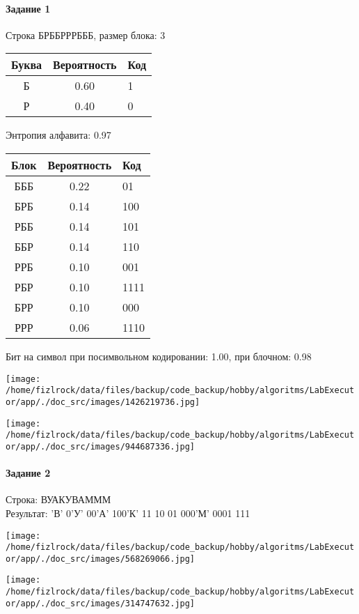 \documentclass[a4paper, 12pt]{article}
\begin{document}
\paragraph{Задание 1}

Строка БРББРРРБББ, размер блока: 3
\begin{center}
 \begin{tabular}{ |c|c|l| } 
  \hline
     Буква & Вероятность & Код\\ \hline
Б & 0.60 & 1\\\hline
Р & 0.40 & 0
\\ \hline \end{tabular}
\end{center}
Энтропия алфавита: 0.97
\begin{center}
 \begin{tabular}{ |c|c|l| } 
  \hline
     Блок & Вероятность & Код\\ \hline
БББ & 0.22 & 01\\\hline
БРБ & 0.14 & 100\\\hline
РББ & 0.14 & 101\\\hline
ББР & 0.14 & 110\\\hline
РРБ & 0.10 & 001\\\hline
РБР & 0.10 & 1111\\\hline
БРР & 0.10 & 000\\\hline
РРР & 0.06 & 1110
\\ \hline \end{tabular}
\end{center}
Бит на символ при посимвольном кодировании: 1.00, при блочном: 0.98

\texttt{[image: /home/fizlrock/data/files/backup/code\_backup/hobby/algoritms/LabExecutor/app/./doc\_src/images/1426219736.jpg]}

\texttt{[image: /home/fizlrock/data/files/backup/code\_backup/hobby/algoritms/LabExecutor/app/./doc\_src/images/944687336.jpg]}
\pagebreak
\paragraph{Задание 2}

Строка: 
ВУАКУВАМММ\\
Результат: 'В' 0'У' 00'А' 100'К' 11 10 01 000'М' 0001 111

\texttt{[image: /home/fizlrock/data/files/backup/code\_backup/hobby/algoritms/LabExecutor/app/./doc\_src/images/568269066.jpg]}

\texttt{[image: /home/fizlrock/data/files/backup/code\_backup/hobby/algoritms/LabExecutor/app/./doc\_src/images/314747632.jpg]}
\end{document}
